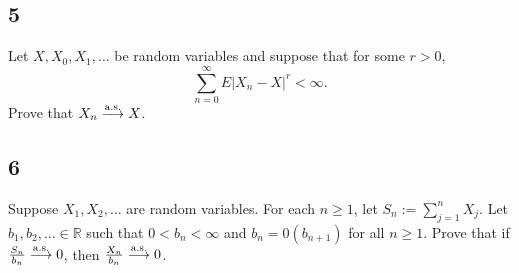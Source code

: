 \documentclass[12pt]{article}
\begin{document}
\subsection*{5}
\begin{tcolorbox}
Let $X, X_{0}, X_{1}, \hdots$ be random variables and suppose that for some $r > 0$,
\[ \sum_{n=0}^{\infty}E|X_{n} - X|^{r} < \infty. \]
Prove that $X_{n} \stackrel{\text{a.s.}}{\longrightarrow} X$.
\end{tcolorbox}

\subsection*{6}
\begin{tcolorbox}
Suppose $X_{1}, X_{2}, \hdots$ are random variables. For each $n \geq 1$, let $S_{n} := \sum_{j=1}^{n}X_{j}$. Let $b_{1}, b_{2}, \hdots \in
\mathbb{R}$ such that $0 < b_{n} < \infty$ and $b_{n} = \mathcal{0}(b_{n+1})$ for all $n \geq 1$. Prove that if 
$\frac{S_{n}}{b_{n}} \stackrel{\text{a.s.}}{\longrightarrow} 0$, then $\frac{X_{n}}{b_{n}} \stackrel{\text{a.s.}}{\longrightarrow} 0$.
\end{tcolorbox}
\end{document}
